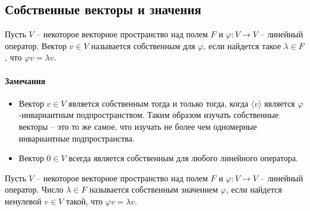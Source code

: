 

\subsection{Собственные векторы и значения}

\begin{definition}
Пусть $V$ -- некоторое векторное пространство над полем $F$ и $\varphi \colon V\to V$ -- линейный оператор. Вектор $v\in V$ называется собственным для $\varphi$, если найдется такое $\lambda \in F$, что $\varphi v = \lambda v$.
\end{definition}

\paragraph{Замечания}

\begin{itemize}

\item Вектор $v\in V$ является собственным тогда и только тогда, когда $\langle v \rangle$ является $\varphi$-инвариантным подпространством. Таким образом изучать собственные векторы -- это то же самое, что изучать не более чем одномерные инвариантные подпространства. 

\item Вектор $0\in V$ всегда является собственным для любого линейного оператора.
\end{itemize}

\begin{definition}
Пусть $V$ -- некоторое векторное пространство над полем $F$ и $\varphi \colon V\to V$ -- линейный оператор. Число $\lambda \in F$ называется собственным значением $\varphi$, если найдется ненулевой $v\in V$ такой, что $\varphi v = \lambda v$.
\end{definition}

